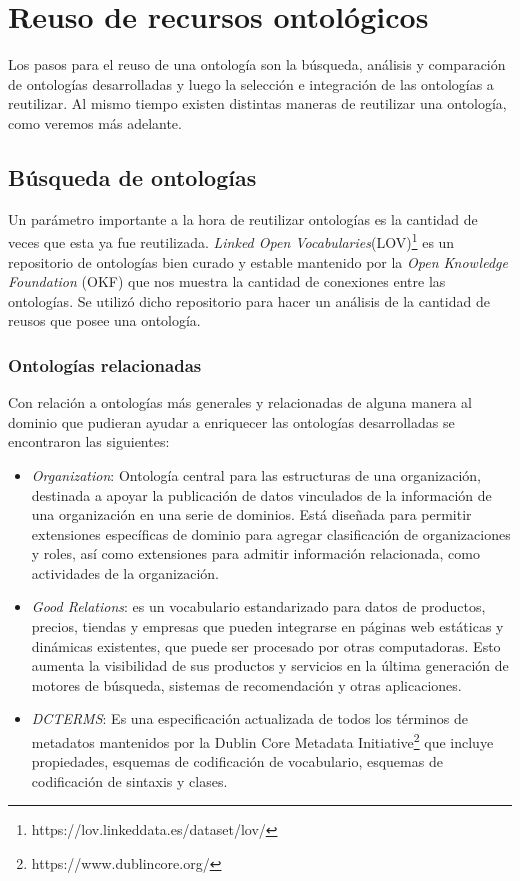 
\section{Reuso de recursos ontológicos}
Los pasos para el reuso de una ontología son la búsqueda, análisis y comparación de ontologías desarrolladas y luego la selección e integración de las ontologías a reutilizar. Al mismo tiempo existen distintas maneras de reutilizar una ontología, como veremos más adelante. 

\subsection{Búsqueda de ontologías}
\label{section:busqueda de ontologias}

Un parámetro importante a la hora de reutilizar ontologías es la cantidad de veces que esta ya fue reutilizada. \textit{Linked Open Vocabularies}(LOV)\footnote{https://lov.linkeddata.es/dataset/lov/} es un repositorio de ontologías bien curado y estable mantenido por la \textit{Open Knowledge Foundation}  (OKF) que nos muestra la cantidad de conexiones entre las ontologías. Se utilizó dicho repositorio para hacer un análisis de la cantidad de reusos que posee una ontología.

\subsubsection{Ontologías relacionadas}

Con relación a ontologías más generales y relacionadas de alguna manera al dominio que pudieran ayudar a enriquecer las ontologías desarrolladas se encontraron las siguientes:
\begin{itemize}
    \item \textit{Organization}\cite{TheOrgan48:online}: Ontología central para las estructuras de una organización, destinada a apoyar la publicación de datos vinculados de la información de una organización en una serie de dominios. Está diseñada para permitir extensiones específicas de dominio para agregar clasificación de organizaciones y roles, así como extensiones para admitir información relacionada, como actividades de la organización.
    \item \textit{Good Relations}\cite{hepp2008goodrelations}: es un vocabulario estandarizado para datos de productos, precios, tiendas y empresas que pueden integrarse en páginas web estáticas y dinámicas existentes, que puede ser procesado por otras computadoras. Esto aumenta la visibilidad de sus productos y servicios en la última generación de motores de búsqueda, sistemas de recomendación y otras aplicaciones.
    \item \textit{DCTERMS}\cite{DCMIDCMI37:online}: Es una especificación actualizada de todos los términos de metadatos mantenidos por la Dublin Core Metadata Initiative\footnote{https://www.dublincore.org/} que incluye propiedades, esquemas de codificación de vocabulario, esquemas de codificación de sintaxis y clases. 
\end{itemize}

